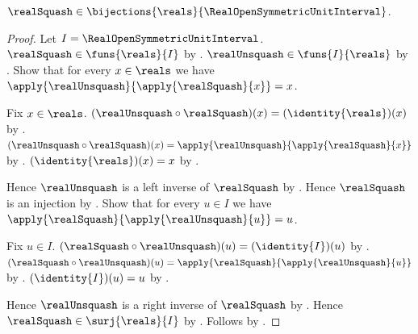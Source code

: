 \begin{theorem}\label{real_squash_bijection_open_symmetric_unit}
    $\realSquash\in
        \bijections{\reals}{\RealOpenSymmetricUnitInterval}$.
\end{theorem}
\begin{proof}
    Let $I=\RealOpenSymmetricUnitInterval$.
    $\realSquash\in\funs{\reals}{I}$
        by .
    $\realUnsquash\in\funs{I}{\reals}$
        by .
    Show that for every $x\in\reals$ we have
        $\apply{\realUnsquash}{\apply{\realSquash}{x}}=x$.
    \begin{subproof}
        Fix $x\in\reals$.
        $(\realUnsquash\circ\realSquash)(x)
            =(\identity{\reals})(x)$
            by .
        $(\realUnsquash\circ\realSquash)(x)
            =\apply{\realUnsquash}{\apply{\realSquash}{x}}$
            by .
        $(\identity{\reals})(x)=x$ by .
    \end{subproof}
    Hence $\realUnsquash$ is a left inverse of $\realSquash$
        by .
    Hence $\realSquash$ is an injection
        by .
    Show that for every $u\in I$ we have
        $\apply{\realSquash}{\apply{\realUnsquash}{u}}=u$.
    \begin{subproof}
        Fix $u\in I$.
        $(\realSquash\circ\realUnsquash)(u)
            =(\identity{I})(u)$
            by .
        $(\realSquash\circ\realUnsquash)(u)
            =\apply{\realSquash}{\apply{\realUnsquash}{u}}$
            by .
        $(\identity{I})(u)=u$ by .
    \end{subproof}
    Hence $\realUnsquash$ is a right inverse of $\realSquash$
        by .
    Hence $\realSquash\in\surj{\reals}{I}$
        by .
    Follows by .
\end{proof}


